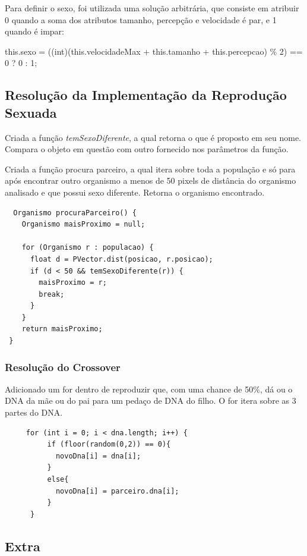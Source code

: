 \documentclass[
	12pt,				%
	oneside,			%
	a4paper,			%
	english,			%
	brazil,				%
	]{abntex2}
\begin{document}
{Para definir o sexo, foi utilizada uma solução arbitrária, que consiste em atribuir 0 quando a soma dos atributos tamanho, percepção e velocidade é par, e 1 quando é impar:

\begin{itshape}
this.sexo = ((int)(this.velocidadeMax + this.tamanho + this.percepcao) \% 2) == 0 ? 0 : 1; 
\end{itshape}

\subsection{Resolução da Implementação da Reprodução Sexuada}

Criada a função \textit{temSexoDiferente}, a qual retorna o que é proposto em seu nome. Compara o objeto em questão com outro fornecido nos parâmetros da função.

Criada a função procura parceiro, a qual itera sobre toda a população e só para após encontrar outro organismo a menos de 50 pixels de distância do organismo analisado e que possui sexo diferente. Retorna o organismo encontrado.

\begin{verbatim}
  Organismo procuraParceiro() {
    Organismo maisProximo = null;

    for (Organismo r : populacao) {
      float d = PVector.dist(posicao, r.posicao);
      if (d < 50 && temSexoDiferente(r)) {
        maisProximo = r;
        break;
      }
    }
    return maisProximo;
 }
\end{verbatim}

\subsubsection{Resolução do Crossover}

Adicionado um for dentro de reproduzir que, com uma chance de 50\%, dá ou o DNA da mãe ou do pai para um pedaço de DNA do filho. O for itera sobre as 3 partes do DNA.

\begin{verbatim}
     for (int i = 0; i < dna.length; i++) {
          if (floor(random(0,2)) == 0){
            novoDna[i] = dna[i];
          }
          else{
            novoDna[i] = parceiro.dna[i];
          }
      }
\end{verbatim}
\subsection{Extra}

}
\end{document}
